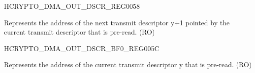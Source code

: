 \begin{register}{H}{CRYPTO\_DMA\_OUT\_DSCR\_REG}{\hexprefix{}0058}\label{regdesc:CRYPTODMAOUTDSCRREG}
%
\regnewline%
\begin{regdesc}\begin{reglist}
\label{fielddesc:CRYPTODMAOUTLINKDSCR}\item [CRYPTO\_DMA\_OUTLINK\_DSCR] Represents the address of the next transmit descriptor y+1 pointed by the current transmit descriptor that is pre-read. (RO)
\end{reglist}\end{regdesc}
\end{register}


\begin{register}{H}{CRYPTO\_DMA\_OUT\_DSCR\_BF0\_REG}{\hexprefix{}005C}\label{regdesc:CRYPTODMAOUTDSCRBF0REG}
%
\regnewline%
\begin{regdesc}\begin{reglist}
\label{fielddesc:CRYPTODMAOUTLINKDSCRBF0}\item [CRYPTO\_DMA\_OUTLINK\_DSCR\_BF0] Represents the address of the current transmit descriptor y that is pre-read. (RO)
\end{reglist}\end{regdesc}
\end{register}

